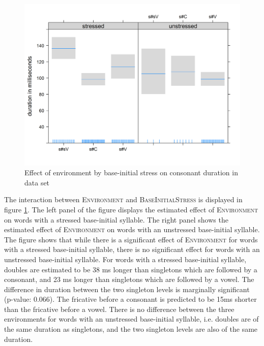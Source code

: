 \begin{figure} [b!]
\vspace*{-0.7cm}
	\centering
	\includegraphics [scale=0.5]{images/Corpus/disModelTransitionTypeByStress.png}
	\caption{Effect of environment by base-initial stress on consonant duration in data set}
	\label{fig:corpus main effect 1 dis}
\end{figure}

The interaction between \textsc{Environment} and \textsc{BaseInitialStress} is displayed in figure \ref{fig:corpus main effect 1 dis}. The left panel of the figure displays the estimated effect of \textsc{Environment} on words with a stressed base-initial syllable. The right panel shows the estimated effect of \textsc{Environment} on words with an unstressed base-initial syllable. The figure shows that while there is a significant effect of \textsc{Environment} for words with a stressed base-initial syllable, there is no significant effect for words with an unstressed base-initial syllable. For words with a stressed base-initial syllable, doubles are estimated to be 38 ms  longer than singletons which are followed by a consonant, and 23 ms longer than singletons which are followed by a vowel. 
The difference in duration between the two singleton levels is marginally significant (p-value: $0.066$). The fricative before a consonant is predicted to be 15ms shorter than the fricative before a vowel.  There is no difference between the three environments for words with an unstressed base-initial syllable, i.e. doubles are of the same duration as singletons, and the two singleton levels are  also of the same duration. 


